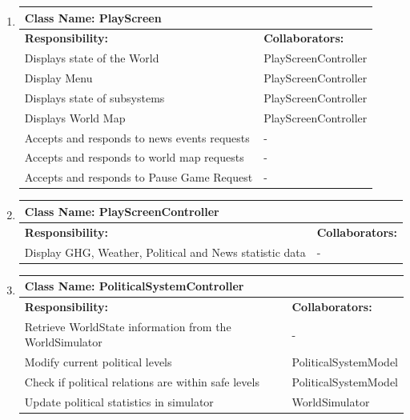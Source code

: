 \documentclass[]{article}
\begin{document}
\begin{enumerate}[1.]
\begin{tabular}{|p{10cm}|p{4cm}|}
	    \hline
	  \end{tabular}

	\item
	\begin{tabular}{|p{10cm}|p{4cm}|}
	    \hline
	     \multicolumn{2}{|l|}{\textbf{Class Name:  PlayScreen}} \\
	    \hline
	    \textbf{Responsibility:} & \textbf{Collaborators:} \\
	    \hline
	    Displays state of the World & PlayScreenController \\
	Display Menu & PlayScreenController \\
	Displays state of subsystems & PlayScreenController \\
	Displays World Map & PlayScreenController \\
	Accepts and responds to news events requests & - \\
	Accepts and responds to world map requests & - \\
	Accepts and responds to Pause Game Request & - \\

	    \hline
	  \end{tabular}

	\item
	\begin{tabular}{|p{10cm}|p{4cm}|}
	    \hline
	     \multicolumn{2}{|l|}{\textbf{Class Name:  PlayScreenController}} \\
	    \hline
	    \textbf{Responsibility:} & \textbf{Collaborators:} \\
	    \hline
	    Display GHG, Weather, Political and News statistic data & - \\

	    \hline
	  \end{tabular}

	\item
	\begin{tabular}{|p{10cm}|p{4cm}|}
	    \hline
	     \multicolumn{2}{|l|}{\textbf{Class Name:  PoliticalSystemController}} \\
	    \hline
	    \textbf{Responsibility:} & \textbf{Collaborators:} \\
	    \hline
			Retrieve WorldState information from the WorldSimulator & - \\
	    Modify current political levels & PoliticalSystemModel \\
			Check if political relations are within safe levels & PoliticalSystemModel \\
	Update political statistics in simulator & WorldSimulator \\


\end{tabular}
\end{enumerate}
\end{document}
